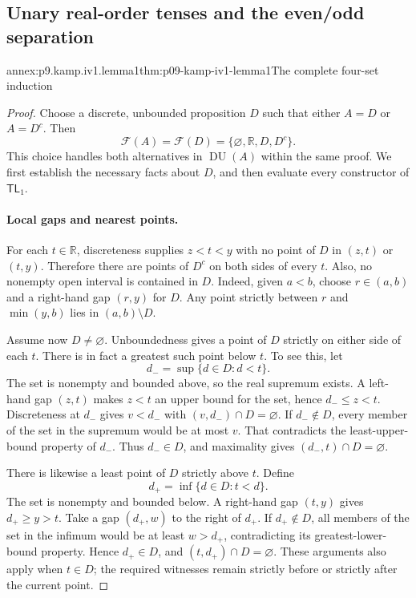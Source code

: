 
\subsection{Unary real-order tenses and the even/odd separation}
\label{sec:annex-p09-kamp-iv1-unary-separation}

\begin{annexitem}{annex:p9.kamp.iv1.lemma1}{thm:p09-kamp-iv1-lemma1}{The complete four-set induction}
\begin{proof}
Choose a discrete, unbounded proposition \(D\) such that either
\(A=D\) or \(A=D^c\). Then
\[
                 \mathcal F(A)=\mathcal F(D)
                     =\{\varnothing,\mathbb R,D,D^c\}.
\]
This choice handles both alternatives in \(\operatorname{DU}(A)\)
within the same proof. We first establish the necessary facts about
\(D\), and then evaluate every constructor of
\(\mathsf{TL}_1\).

\paragraph{Local gaps and nearest points.}
For each \(t\in\mathbb R\), discreteness supplies
\(z<t<y\) with no point of \(D\) in \((z,t)\) or
\((t,y)\). Therefore there are points of \(D^c\) on both
sides of every \(t\). Also, no nonempty open interval is
contained in \(D\). Indeed, given \(a<b\), choose
\(r\in(a,b)\) and a right-hand gap \((r,y)\) for \(D\).
Any point strictly between \(r\) and \(\min(y,b)\)
lies in \((a,b)\setminus D\).

Assume now \(D\ne\varnothing\). Unboundedness gives a point
of \(D\) strictly on either side of each \(t\). There is in
fact a greatest such point below \(t\). To see this, let
\[
                 d_- =\sup\{d\in D:d<t\}.
\]
The set is nonempty and bounded above, so the real supremum exists.
A left-hand gap \((z,t)\) makes \(z<t\) an upper bound
for the set, hence \(d_-\leq z<t\). Discreteness at
\(d_-\) gives \(v<d_-\) with
\((v,d_-)\cap D=\varnothing\). If \(d_-\notin D\),
every member of the set in the supremum would be at most \(v\).
That contradicts the least-upper-bound property of \(d_-\).
Thus \(d_-\in D\), and maximality gives
\((d_-,t)\cap D=\varnothing\).

There is likewise a least point of \(D\) strictly above
\(t\). Define
\[
                 d_+ =\inf\{d\in D:t<d\}.
\]
The set is nonempty and bounded below. A right-hand gap
\((t,y)\) gives \(d_+\geq y>t\). Take a gap
\((d_+,w)\) to the right of \(d_+\). If
\(d_+\notin D\), all members of the set in the infimum
would be at least \(w>d_+\), contradicting its
greatest-lower-bound property. Hence \(d_+\in D\),
and \((t,d_+)\cap D=\varnothing\). These arguments
also apply when \(t\in D\); the required witnesses remain
strictly before or strictly after the current point.


\end{proof}
\end{annexitem}
